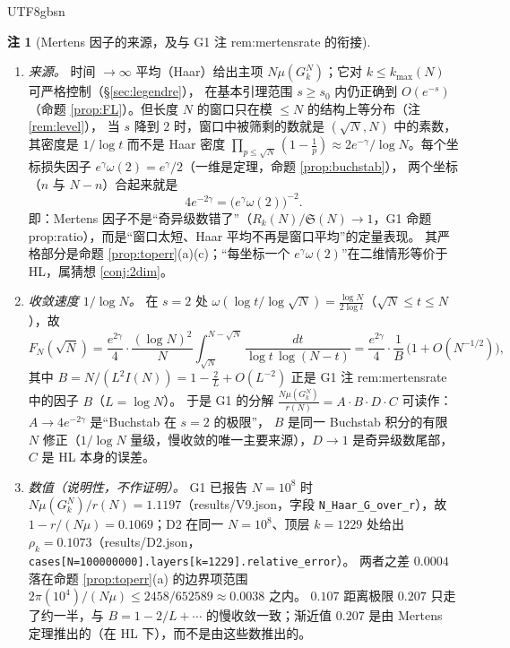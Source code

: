 \documentclass[11pt,a4paper]{article}
\newcommand{\Haar}{\mu}
\newcommand{\Sing}{\mathfrak S}
\newcommand{\kmax}{k_{\max}}
\theoremstyle{plain}
\theoremstyle{definition}
\newtheorem{rem}[prop]{注}
\begin{document}
\begin{CJK}{UTF8}{gbsn}
\begin{rem}[Mertens 因子的来源，及与 G1 注 rem:mertensrate 的衔接]\label{rem:mertenssource}
\begin{enumerate}[leftmargin=*,label=(\arabic*)]
\item \emph{来源。} 时间 $\to\infty$ 平均（Haar）给出主项 $N\Haar(G_k^N)$；它对 $k\le\kmax(N)$ 可严格控制（\S\ref{sec:legendre}），
在基本引理范围 $s\ge s_0$ 内仍正确到 $O(e^{-s})$（命题 \ref{prop:FL}）。但长度 $N$ 的窗口只在模 $\le N$ 的结构上等分布（注 \ref{rem:level}），
当 $s$ 降到 $2$ 时，窗口中被筛剩的数就是 $(\sqrt N,N)$ 中的素数，其密度是 $1/\log t$ 而不是 Haar 密度
$\prod_{p\le\sqrt N}(1-\frac1p)\approx2e^{-\gamma}/\log N$。每个坐标损失因子 $e^\gamma\omega(2)=e^\gamma/2$（一维是定理，命题 \ref{prop:buchstab}），
两个坐标（$n$ 与 $N-n$）合起来就是
\[
4e^{-2\gamma}=\bigl(e^\gamma\omega(2)\bigr)^{-2}.
\]
即：Mertens 因子不是“奇异级数错了”（$R_k(N)/\Sing(N)\to1$，G1 命题 prop:ratio），而是“窗口太短、Haar 平均不再是窗口平均”的定量表现。
其严格部分是命题 \ref{prop:toperr}(a)(c)；“每坐标一个 $e^\gamma\omega(2)$”在二维情形等价于 HL，属猜想 \ref{conj:2dim}。
\item \emph{收敛速度 $1/\log N$。} 在 $s=2$ 处 $\omega(\log t/\log\sqrt N)=\frac{\log N}{2\log t}$（$\sqrt N\le t\le N$），故
\[
F_N(\sqrt N)=\frac{e^{2\gamma}}4\cdot\frac{(\log N)^2}{N}\int_{\sqrt N}^{N-\sqrt N}\frac{dt}{\log t\,\log(N-t)}
=\frac{e^{2\gamma}}{4}\cdot\frac1{B}\,\bigl(1+O(N^{-1/2})\bigr),
\]
其中 $B=N/(L^2I(N))=1-\frac2L+O(L^{-2})$ 正是 G1 注 rem:mertensrate 中的因子 $B$（$L=\log N$）。
于是 G1 的分解 $\frac{N\Haar(G_k^N)}{r(N)}=A\cdot B\cdot D\cdot C$ 可读作：$A\to4e^{-2\gamma}$ 是“Buchstab 在 $s=2$ 的极限”，
$B$ 是同一 Buchstab 积分的有限 $N$ 修正（$1/\log N$ 量级，慢收敛的唯一主要来源），$D\to1$ 是奇异级数尾部，$C$ 是 HL 本身的误差。
\item \emph{数值（说明性，不作证明）。} G1 已报告 $N=10^8$ 时 $N\Haar(G_k^N)/r(N)=1.1197$（results/V9.json，字段
\texttt{N\_Haar\_G\_over\_r}），故 $1-r/(N\Haar)=0.1069$；D2 在同一 $N=10^8$、顶层 $k=1229$ 处给出
$\rho_k=0.1073$（results/D2.json，\texttt{cases[N=100000000].layers[k=1229].relative\_error}）。
两者之差 $0.0004$ 落在命题 \ref{prop:toperr}(a) 的边界项范围 $2\pi(10^4)/(N\Haar)\le2458/652589\approx0.0038$ 之内。
$0.107$ 距离极限 $0.207$ 只走了约一半，与 $B=1-2/L+\cdots$ 的慢收敛一致；渐近值 $0.207$ 是由 Mertens 定理推出的（在 HL 下），而不是由这些数推出的。
\end{enumerate}
\end{rem}


\end{CJK}
\end{document}
